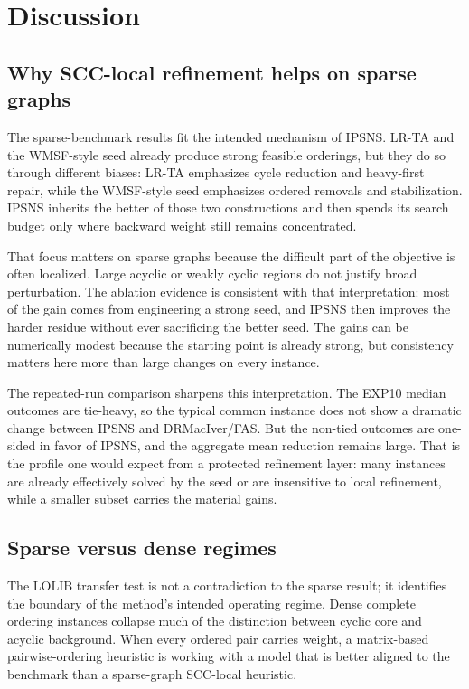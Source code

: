 \section{Discussion}
\label{sec:discussion}

\subsection{Why SCC-local refinement helps on sparse graphs}

The sparse-benchmark results fit the intended mechanism of IPSNS. LR-TA and the WMSF-style seed already produce strong feasible orderings, but they do so through different biases: LR-TA emphasizes cycle reduction and heavy-first repair, while the WMSF-style seed emphasizes ordered removals and stabilization. IPSNS inherits the better of those two constructions and then spends its search budget only where backward weight still remains concentrated.

That focus matters on sparse graphs because the difficult part of the objective is often localized. Large acyclic or weakly cyclic regions do not justify broad perturbation. The ablation evidence is consistent with that interpretation: most of the gain comes from engineering a strong seed, and IPSNS then improves the harder residue without ever sacrificing the better seed. The gains can be numerically modest because the starting point is already strong, but consistency matters here more than large changes on every instance.

The repeated-run comparison sharpens this interpretation. The EXP10 median outcomes are tie-heavy, so the typical common instance does not show a dramatic change between IPSNS and DRMacIver/FAS. But the non-tied outcomes are one-sided in favor of IPSNS, and the aggregate mean reduction remains large. That is the profile one would expect from a protected refinement layer: many instances are already effectively solved by the seed or are insensitive to local refinement, while a smaller subset carries the material gains.

\subsection{Sparse versus dense regimes}

The LOLIB transfer test is not a contradiction to the sparse result; it identifies the boundary of the method's intended operating regime. Dense complete ordering instances collapse much of the distinction between cyclic core and acyclic background. When every ordered pair carries weight, a matrix-based pairwise-ordering heuristic is working with a model that is better aligned to the benchmark than a sparse-graph SCC-local heuristic.

